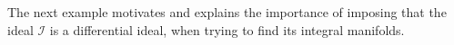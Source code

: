 \documentclass[11pt]{article}
\theoremstyle{plain}
\theoremstyle{definition}
\begin{document}







The next example motivates and explains the importance of imposing that the ideal $\mathcal I$ is a differential ideal, when trying to find its integral manifolds.
\end{document}
